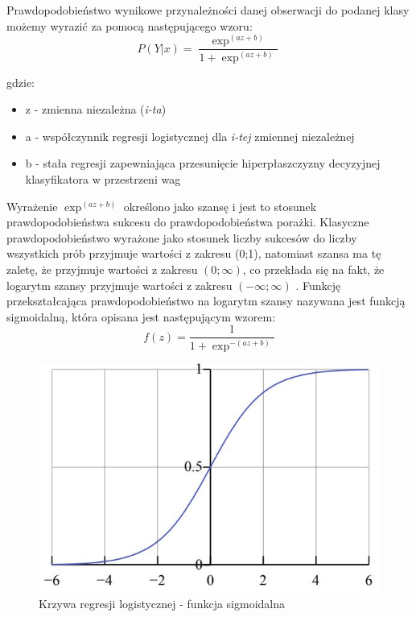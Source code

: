 Prawdopodobieństwo wynikowe przynależności danej obserwacji do podanej klasy możemy wyrazić za pomocą następującego wzoru:
\begin{equation}
    P(Y|x) = \frac{\exp^{(az + b)}}{1 + \exp^{(az + b)}}
\end{equation}

gdzie:
\begin{itemize}
    \item z - zmienna niezależna (\textit{i-ta})
    \item a - współczynnik regresji logistycznej dla \textit{i-tej} zmiennej niezależnej
    \item b - stała regresji zapewniająca przesunięcie hiperpłaszczyzny decyzyjnej klasyfikatora w przestrzeni wag
\end{itemize}


Wyrażenie $\exp^{(az + b)}$ określono jako szansę i jest to stosunek prawdopodobieństwa sukcesu do prawdopodobieństwa porażki. Klasyczne prawdopodobieństwo wyrażone jako stosunek liczby sukcesów do liczby wszystkich prób przyjmuje wartości z zakresu (0;1), natomiast szansa ma tę zaletę, że przyjmuje wartości z zakresu $(0;\infty)$, co przekłada się na fakt, że logarytm szansy przyjmuje wartości z zakresu $(-\infty;\infty)$ \cite{Hosmer}. Funkcję przekształcająca prawdopodobieństwo na logarytm szansy nazywana jest funkcją sigmoidalną, która opisana jest następującym wzorem:\\

\begin{equation}
    f(z) = \frac{1}{1 + \exp^{-(az + b)}}
\end{equation}


\begin{figure}[h] 
        \centering\includegraphics[width=15cm]{figures/sigmoidFunc.JPG}
        \caption{Krzywa regresji logistycznej - funkcja sigmoidalna \cite{MGrzyb}}
\end{figure}


